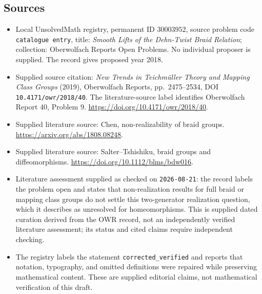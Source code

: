 \documentclass[11pt]{article}
\begin{document}
\subsection{Sources}
\begin{itemize}
\item Local UnsolvedMath registry, permanent ID \(30003952\), source problem code \texttt{catalogue entry}, title: \emph{Smooth Lifts of the Dehn-Twist Braid Relation}; collection: Oberwolfach Reports Open Problems. No individual proposer is supplied. The record gives proposed year 2018.
\item Supplied source citation: \emph{New Trends in Teichm\"uller Theory and Mapping Class Groups} (2019), Oberwolfach Reports, pp.\ 2475--2534, DOI \texttt{10.4171/owr/2018/40}. The literature-source label identifies Oberwolfach Report 40, Problem 9. \url{https://doi.org/10.4171/owr/2018/40}.
\item Supplied literature source: Chen, non-realizability of braid groups. \url{https://arxiv.org/abs/1808.08248}.
\item Supplied literature source: Salter--Tshishiku, braid groups and diffeomorphisms. \url{https://doi.org/10.1112/blms/bdw016}.
\item Literature assessment supplied as checked on \texttt{2026-08-21}: the record labels the problem open and states that non-realization results for full braid or mapping class groups do not settle this two-generator realization question, which it describes as unresolved for homeomorphisms. This is supplied dated curation derived from the OWR record, not an independently verified literature assessment; its status and cited claims require independent checking.
\item The registry labels the statement \texttt{corrected\_verified} and reports that notation, typography, and omitted definitions were repaired while preserving mathematical content. These are supplied editorial claims, not mathematical verification of this draft.
\end{itemize}
\end{document}

